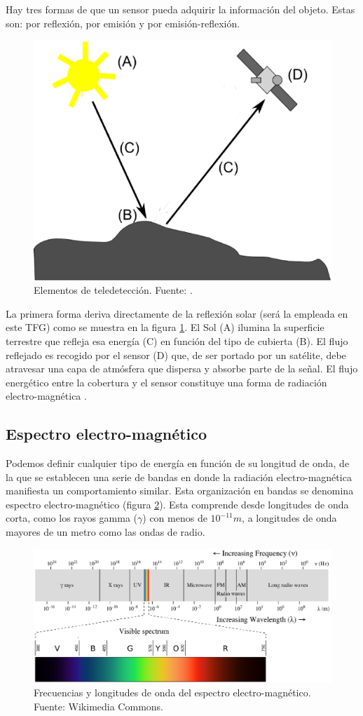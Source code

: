 Hay tres formas de que un sensor pueda adquirir la información del objeto. Estas son: por reflexión, por emisión y por emisión-reflexión.\Sep

\begin{figure}
	\centering
	\includegraphics[width=0.4\linewidth]{./Imagenes/Elementos_teledeteccion_modificado.eps}
	\caption[Elementos de teledetección]{Elementos de teledetección. Fuente: \cite{Olaya2010}.}
	\label{fig:elementos}
\end{figure}

La primera forma deriva directamente de la reflexión solar (será la empleada en este \ac{TFG}) como se muestra en la figura \ref{fig:elementos}. El Sol (A) ilumina la superficie terrestre que refleja esa energía (C) en función del tipo de cubierta (B). El flujo reflejado es recogido por el sensor (D) que, de ser portado por un satélite, debe atravesar una capa de atmósfera que dispersa y absorbe parte de la señal. El flujo energético entre la cobertura y el sensor constituye una forma de radiación electro-magnética \citep{Olaya2010}.\Sep

\subsection{Espectro electro-magnético}
Podemos definir cualquier tipo de energía en función de su longitud de onda, de la que se establecen una serie de bandas en donde la radiación electro-magnética manifiesta un comportamiento similar. Esta organización en bandas se denomina espectro electro-magnético (figura \ref{fig:espectro}). Esta comprende desde longitudes de onda corta, como los rayos gamma ($\gamma$) con menos de $10^{-11} m$, a longitudes de onda mayores de un metro como las ondas de radio.\Sep

\begin{figure}
	\centering	
	\includegraphics[width=0.9\linewidth]{./Imagenes/Espectro.eps}
	\caption[Espectro electro-magnético]{Frecuencias y longitudes de onda del espectro electro-magnético. Fuente: Wikimedia Commons.}
	\label{fig:espectro}
\end{figure}

